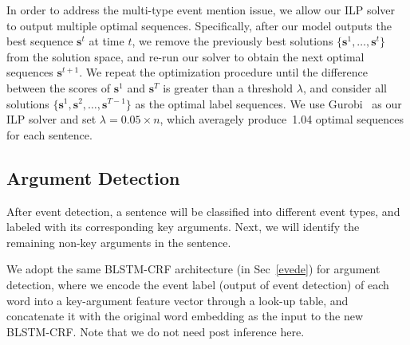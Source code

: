 In order to address the multi-type event mention issue, we allow our ILP solver to output multiple optimal sequences. 
Specifically, after our model outputs the best sequence $\bm{s}^t$ at time $t$, we remove the previously best solutions 
 $\{\bm{s}^1, \ldots, \bm{s}^{t}\}$ from the solution space, and re-run our solver to obtain the next optimal sequences $\bm{s}^{t+1}$. 
We repeat the optimization procedure until the difference between the scores of $\bm{s}^1$ and $\bm{s}^T$ is greater 
than a threshold $\lambda$, and consider all solutions $\{\bm{s}^1, \bm{s}^2, \ldots, \bm{s}^{T-1}\}$ as the optimal label sequences. 
We use Gurobi~\cite{gurobi} as our ILP solver and set $\lambda=0.05 \times n$, which averagely produce~1.04 optimal sequences for each sentence. 

\subsection{Argument Detection}
After event detection, a sentence will be classified into different event types, and labeled with its corresponding key arguments. 
Next, we will identify the remaining non-key arguments in the sentence.  

We adopt the same BLSTM-CRF architecture (in Sec~\ref{evede}) for argument detection, where we encode the event label (output of event detection) of each word into a key-argument feature vector through a look-up table, and concatenate it with the original word embedding as the input to the new BLSTM-CRF. Note that we do not need post inference here.
